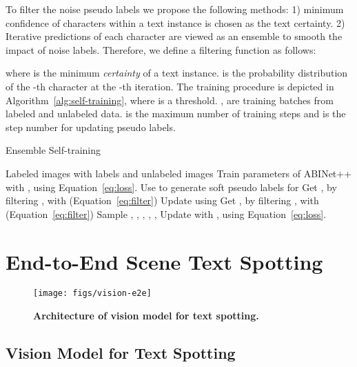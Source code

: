 \documentclass[10pt,journal,compsoc]{IEEEtran}
\begin{document}
To filter the noise pseudo labels we propose the following methods: 1) minimum confidence of characters within a text instance is chosen as the text certainty. 2) Iterative predictions of each character are viewed as an ensemble to smooth the impact of noise labels. Therefore, we define a filtering function as follows:

where  is the minimum \emph{certainty} of a text instance.  is the probability distribution of the -th character at the -th iteration. The training procedure is depicted in Algorithm~\ref{alg:self-training}, where  is a threshold. ,  are training batches from labeled and unlabeled data.  is the maximum number of training steps and  is the step number for updating pseudo labels.  


\begin{algorithm}[t]
   \scriptsize
   \caption{Ensemble Self-training}
   \begin{algorithmic}[1]
      \Require Labeled images  with labels  and unlabeled images 
      \State Train parameters  of ABINet++ with ,  using Equation~\ref{eq:loss}.
      \State Use  to generate soft pseudo labels  for 
      \State Get ,  by filtering ,  with  (Equation~\ref{eq:filter})
      \For{}
         \If{}
            \State Update  using 
            \State Get ,  by filtering ,  with  (Equation~\ref{eq:filter})
         \EndIf
         \State Sample , , , , , 
         \State Update  with ,  using Equation~\ref{eq:loss}.
      \EndFor
   \end{algorithmic}
   \label{alg:self-training}
\end{algorithm}





\section{End-to-End Scene Text Spotting}

\begin{figure}
  \begin{center}
     \texttt{[image: figs/vision-e2e]}
     \caption{\textbf{Architecture of vision model for text spotting.}}
     \label{fig:vision-e2e}
  \end{center}
  \vspace{-1em}    
\end{figure}


\subsection{Vision Model for Text Spotting}
\end{document}
